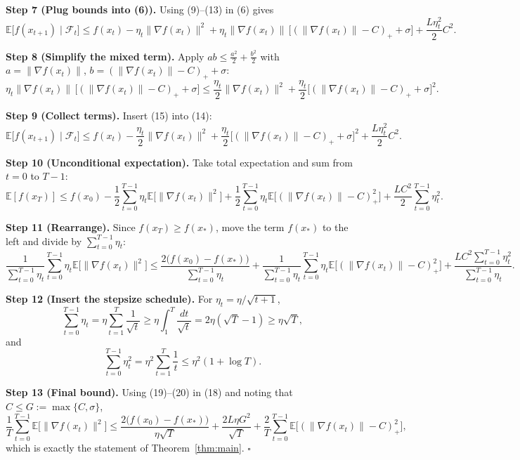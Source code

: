 \documentclass{article}
\newcommand{\EE}{\mathbb{E}}
\begin{document}
\noindent\textbf{Step 7 (Plug bounds into (6)).}  
Using (9)–(13) in (6) gives
\[
\EE\!\big[f(x_{t+1})\mid\mathcal F_t\big]
\le f(x_t)-\eta_t\|\nabla f(x_t)\|^{2}
     +\eta_t\|\nabla f(x_t)\|\,\big[(\|\nabla f(x_t)\|-C)_+ +\sigma\big]
     +\frac{L\eta_t^{2}}{2}C^{2}.
\tag{14}
\]

\noindent\textbf{Step 8 (Simplify the mixed term).}  
Apply $ab\le \frac{a^{2}}{2}+ \frac{b^{2}}{2}$ with  
$a=\|\nabla f(x_t)\|$, $b=(\|\nabla f(x_t)\|-C)_+ +\sigma$:
\[
\eta_t\|\nabla f(x_t)\|\,\big[(\|\nabla f(x_t)\|-C)_+ +\sigma\big]
\le \frac{\eta_t}{2}\|\nabla f(x_t)\|^{2}
   +\frac{\eta_t}{2}\big[(\|\nabla f(x_t)\|-C)_+ +\sigma\big]^{2}.
\tag{15}
\]

\noindent\textbf{Step 9 (Collect terms).}  
Insert (15) into (14):
\[
\EE\!\big[f(x_{t+1})\mid\mathcal F_t\big]
\le f(x_t)-\frac{\eta_t}{2}\|\nabla f(x_t)\|^{2}
   +\frac{\eta_t}{2}\big[(\|\nabla f(x_t)\|-C)_+ +\sigma\big]^{2}
   +\frac{L\eta_t^{2}}{2}C^{2}.
\tag{16}
\]

\noindent\textbf{Step 10 (Unconditional expectation).}  
Take total expectation and sum from $t=0$ to $T-1$:
\[
\EE[f(x_T)]\le f(x_0)-\frac{1}{2}\sum_{t=0}^{T-1}\eta_t
                 \EE\!\big[\|\nabla f(x_t)\|^{2}\big]
   +\frac{1}{2}\sum_{t=0}^{T-1}\eta_t
                 \EE\!\big[(\|\nabla f(x_t)\|-C)_+^{2}\big]
   +\frac{L C^{2}}{2}\sum_{t=0}^{T-1}\eta_t^{2}.
\tag{17}
\]

\noindent\textbf{Step 11 (Rearrange).}  
Since $f(x_T)\ge f(x_*)$, move the term $f(x_*)$ to the left and divide by $\sum_{t=0}^{T-1}\eta_t$:
\[
\frac{1}{\sum_{t=0}^{T-1}\eta_t}
   \sum_{t=0}^{T-1}\eta_t\EE\!\big[\|\nabla f(x_t)\|^{2}\big]
\le
\frac{2\big(f(x_0)-f(x_*)\big)}{\sum_{t=0}^{T-1}\eta_t}
 +\frac{1}{\sum_{t=0}^{T-1}\eta_t}
   \sum_{t=0}^{T-1}\eta_t\EE\!\big[(\|\nabla f(x_t)\|-C)_+^{2}\big]
 +\frac{L C^{2}\sum_{t=0}^{T-1}\eta_t^{2}}{\sum_{t=0}^{T-1}\eta_t}.
\tag{18}
\]

\noindent\textbf{Step 12 (Insert the stepsize schedule).}  
For $\eta_t=\eta/\sqrt{t+1}$,
\[
\sum_{t=0}^{T-1}\eta_t
   =\eta\sum_{t=1}^{T}\frac{1}{\sqrt{t}}
   \ge \eta\int_{1}^{T}\frac{dt}{\sqrt{t}}
   =2\eta(\sqrt{T}-1)
   \ge \eta\sqrt{T},
\tag{19}
\]
and
\[
\sum_{t=0}^{T-1}\eta_t^{2}
   =\eta^{2}\sum_{t=1}^{T}\frac{1}{t}
   \le \eta^{2}(1+\log T).
\tag{20}
\]

\noindent\textbf{Step 13 (Final bound).}  
Using (19)–(20) in (18) and noting that $C\le G:=\max\{C,\sigma\}$,
\[
\frac{1}{T}\sum_{t=0}^{T-1}\EE\!\big[\|\nabla f(x_t)\|^{2}\big]
\le
\frac{2\big(f(x_0)-f(x_*)\big)}{\eta\sqrt{T}}
   +\frac{2L\eta G^{2}}{\sqrt{T}}
   +\frac{2}{T}\sum_{t=0}^{T-1}
        \EE\!\big[(\|\nabla f(x_t)\|-C)_+^{2}\big],
\]
which is exactly the statement of Theorem~\ref{thm:main}. \(\square\)
\end{document}
